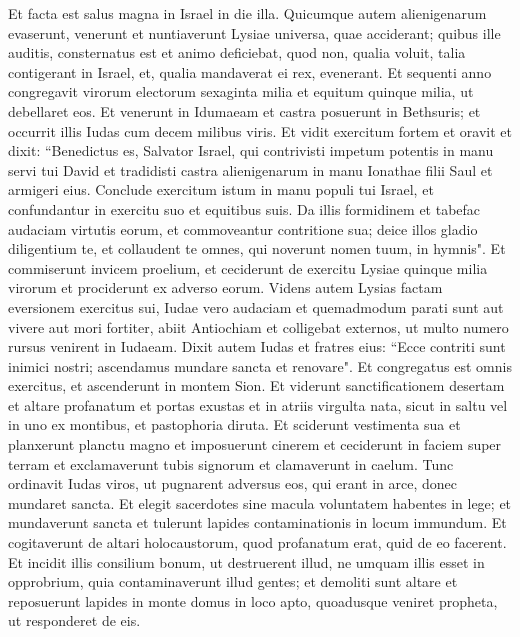 \begin{biblechapter}
\verse Et facta est salus magna in Israel in die illa. 
\verse Quicumque autem alienigenarum evaserunt, venerunt et nuntiaverunt Lysiae universa, quae acciderant; 
\verse quibus ille auditis, consternatus est et animo deficiebat, quod non, qualia voluit, talia contigerant in Israel, et, qualia mandaverat ei rex, evenerant. 
\verse Et sequenti anno congregavit virorum electorum sexaginta milia et equitum quinque milia, ut debellaret eos. 
\verse Et venerunt in Idumaeam et castra posuerunt in Bethsuris; et occurrit illis Iudas cum decem milibus viris. 
\verse Et vidit exercitum fortem et oravit et dixit: “Benedictus es, Salvator Israel, qui contrivisti impetum potentis in manu servi tui David et tradidisti castra alienigenarum in manu Ionathae filii Saul et armigeri eius. 
\verse Conclude exercitum istum in manu populi tui Israel, et confundantur in exercitu suo et equitibus suis. 
\verse Da illis formidinem et tabefac audaciam virtutis eorum, et commoveantur contritione sua; 
\verse deice illos gladio diligentium te, et collaudent te omnes, qui noverunt nomen tuum, in hymnis". 
\verse Et commiserunt invicem proelium, et ceciderunt de exercitu Lysiae quinque milia virorum et prociderunt ex adverso eorum. 
\verse Videns autem Lysias factam eversionem exercitus sui, Iudae vero audaciam et quemadmodum parati sunt aut vivere aut mori fortiter, abiit Antiochiam et colligebat externos, ut multo numero rursus venirent in Iudaeam. 
\verse Dixit autem Iudas et fratres eius: “Ecce contriti sunt inimici nostri; ascendamus mundare sancta et renovare".  
\verse Et congregatus est omnis exercitus, et ascenderunt in montem Sion. 
\verse Et viderunt sanctificationem desertam et altare profanatum et portas exustas et in atriis virgulta nata, sicut in saltu vel in uno ex montibus, et pastophoria diruta. 
\verse Et sciderunt vestimenta sua et planxerunt planctu magno et imposuerunt cinerem 
\verse et ceciderunt in faciem super terram et exclamaverunt tubis signorum et clamaverunt in caelum. 
\verse Tunc ordinavit Iudas viros, ut pugnarent adversus eos, qui erant in arce, donec mundaret sancta. 
\verse Et elegit sacerdotes sine macula voluntatem habentes in lege; 
\verse et mundaverunt sancta et tulerunt lapides contaminationis in locum immundum. 
\verse Et cogitaverunt de altari holocaustorum, quod profanatum erat, quid de eo facerent. 
\verse Et incidit illis consilium bonum, ut destruerent illud, ne umquam illis esset in opprobrium, quia contaminaverunt illud gentes; et demoliti sunt altare  
\verse et reposuerunt lapides in monte domus in loco apto, quoadusque veniret propheta, ut responderet de eis. 

\end{biblechapter}
